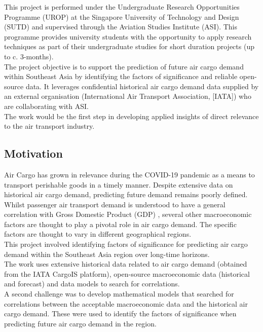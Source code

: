 \documentclass{article}
\begin{document}
This project is performed under the Undergraduate Research Opportunities Programme (UROP) at the Singapore University of Technology and Design (SUTD) and supervised through the Aviation Studies Institute (ASI). This programme provides university students with the opportunity to apply research techniques as part of their undergraduate studies for short duration projects (up to c. 3-months). \\

\noindent The project objective is to support the prediction of future air cargo demand within Southeast Asia by identifying the factors of significance and reliable open-source data. It leverages confidential historical air cargo demand data supplied by an external organisation (International Air Transport Association, [IATA]) who are collaborating with ASI. \\

\noindent The work would be the first step in developing applied insights of direct relevance to the air transport industry. \\

\subsection{Motivation}

Air Cargo has grown in relevance during the COVID-19 pandemic as a means to transport perishable goods in a timely manner. Despite extensive data on historical air cargo demand, predicting future demand remains poorly defined. Whilst passenger air transport demand is understood to have a general correlation with Gross Domestic Product (GDP) \cite{GDPcorr}, several other macroeconomic factors are thought to play a pivotal role in air cargo demand. The specific factors are thought to vary in different geographical regions. \\

\noindent This project involved identifying factors of significance for predicting air cargo demand within the Southeast Asia region over long-time horizons. \\

\noindent The work uses extensive historical data related to air cargo demand (obtained from the IATA CargoIS platform), open-source macroeconomic data (historical and forecast) and data models to search for correlations. \\

\noindent A second challenge was to develop mathematical models that searched for correlations between the acceptable macroeconomic data and the historical air cargo demand. These were used to identify the factors of significance when predicting future air cargo demand in the region. 
\end{document}
